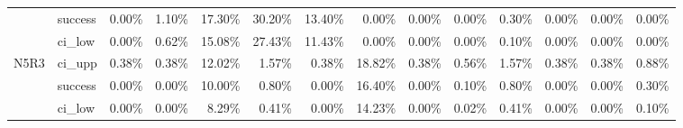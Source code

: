 \begin{tabular}{llrrrrrrrrrrrr}
     & success &       0.00\% &  1.10\% & 17.30\% & 30.20\% & 13.40\% &  0.00\% &        0.00\% & 0.00\% & 0.30\% & 0.00\% & 0.00\% & 0.00\% \\
     & ci\_low &       0.00\% &  0.62\% & 15.08\% & 27.43\% & 11.43\% &  0.00\% &        0.00\% & 0.00\% & 0.10\% & 0.00\% & 0.00\% & 0.00\% \\
N5R3 & ci\_upp &       0.38\% &  0.38\% & 12.02\% &  1.57\% &  0.38\% & 18.82\% &        0.38\% & 0.56\% & 1.57\% & 0.38\% & 0.38\% & 0.88\% \\
     & success &       0.00\% &  0.00\% & 10.00\% &  0.80\% &  0.00\% & 16.40\% &        0.00\% & 0.10\% & 0.80\% & 0.00\% & 0.00\% & 0.30\% \\
     & ci\_low &       0.00\% &  0.00\% &  8.29\% &  0.41\% &  0.00\% & 14.23\% &        0.00\% & 0.02\% & 0.41\% & 0.00\% & 0.00\% & 0.10\% \\
\bottomrule
\end{tabular}

